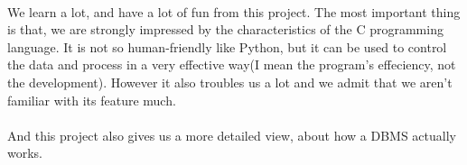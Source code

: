 \documentclass{article}
\begin{document}
    \paragraph{}
        We learn a lot, and have a lot of fun from this project. The most important thing is that, we are strongly impressed by the characteristics of the C programming language. It is not so human-friendly like Python, but it can be used to control the data and process in a very effective way(I mean the program's effeciency, not the development). However it also troubles us a lot and we admit that we aren't familiar with its feature much.
    \paragraph{}
        And this project also gives us a more detailed view, about how a DBMS actually works.
\end{document}
